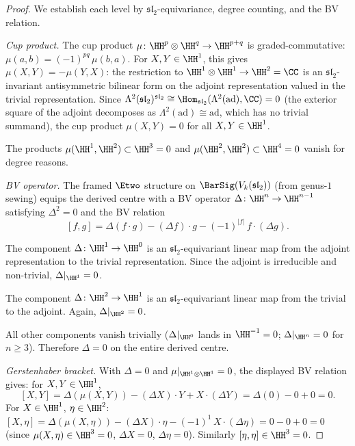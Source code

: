 \begin{proof}
We establish each level by $\mathfrak{sl}_2$-equivariance,
degree counting, and the BV relation.

\textit{Cup product.}
The cup product $\mu\colon \HH^p \otimes \HH^q
\to \HH^{p+q}$ is graded-commutative:
$\mu(a, b) = (-1)^{pq}\,\mu(b, a)$.
For $X, Y \in \HH^1$, this gives
$\mu(X, Y) = -\mu(Y, X)$: the restriction to
$\HH^1 \otimes \HH^1 \to \HH^2 = \CC$ is an
$\mathfrak{sl}_2$-invariant antisymmetric bilinear form
on the adjoint representation valued in the trivial
representation.
Since
$\Lambda^2(\mathfrak{sl}_2)^{\mathfrak{sl}_2}
\cong \Hom_{\mathfrak{sl}_2}(\Lambda^2(\mathrm{ad}), \CC)
= 0$
(the exterior square of the adjoint decomposes as
$\Lambda^2(\mathrm{ad}) \cong \mathrm{ad}$,
which has no trivial summand), the cup product
$\mu(X, Y) = 0$ for all $X, Y \in \HH^1$.

The products $\mu(\HH^1, \HH^2) \subset \HH^3 = 0$ and
$\mu(\HH^2, \HH^2) \subset \HH^4 = 0$ vanish for degree
reasons.

\textit{BV operator.}
The framed $\Etwo$ structure on $\BarSig(V_k(\mathfrak{sl}_2))$
(from genus-$1$ sewing) equips the derived centre with a BV
operator $\Delta\colon \HH^n \to \HH^{n-1}$ satisfying
$\Delta^2 = 0$ and the BV relation
\begin{equation}\label{eq:bv-rel-sl2}
 [f, g]
 = \Delta(f \cdot g) - (\Delta f) \cdot g
 - (-1)^{|f|}\,f \cdot (\Delta g).
\end{equation}

The component $\Delta\colon \HH^1 \to \HH^0$ is an
$\mathfrak{sl}_2$-equivariant linear map from the adjoint
representation to the trivial representation. Since the
adjoint is irreducible and non-trivial,
$\Delta|_{\HH^1} = 0$.

The component $\Delta\colon \HH^2 \to \HH^1$ is an
$\mathfrak{sl}_2$-equivariant linear map from the trivial
to the adjoint. Again, $\Delta|_{\HH^2} = 0$.

All other components vanish trivially
($\Delta|_{\HH^0}$ lands in $\HH^{-1} = 0$;
$\Delta|_{\HH^n} = 0$ for $n \geq 3$). Therefore
$\Delta = 0$ on the entire derived centre.

\textit{Gerstenhaber bracket.}
With $\Delta = 0$ and $\mu|_{\HH^1 \otimes \HH^1} = 0$,
the displayed BV relation gives:
for $X, Y \in \HH^1$,
\[
 [X, Y]
 = \Delta(\mu(X, Y)) - (\Delta X) \cdot Y
 + X \cdot (\Delta Y)
 = \Delta(0) - 0 + 0 = 0.
\]
For $X \in \HH^1$, $\eta \in \HH^2$:
$[X, \eta] = \Delta(\mu(X, \eta)) - (\Delta X) \cdot \eta
- (-1)^1\,X \cdot (\Delta \eta)
= 0 - 0 + 0 = 0$
(since $\mu(X, \eta) \in \HH^3 = 0$,
$\Delta X = 0$, $\Delta\eta = 0$).
Similarly $[\eta, \eta] \in \HH^3 = 0$.


\end{proof}
